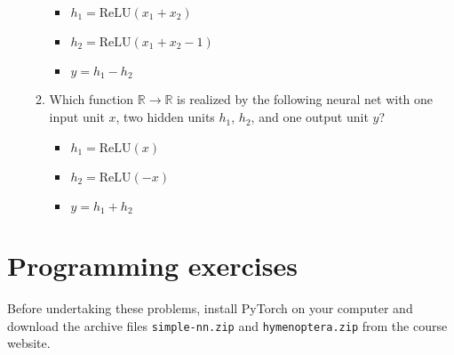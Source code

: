 \documentclass{article}
\begin{document}
\begin{enumerate}
\begin{enumerate}
        \begin{itemize}
            \item $h_{1}=\text{ReLU}(x_{1}+x_{2})$
            \item $h_{2}=\text{ReLU}(x_{1}+x_{2}-1)$
            \item $y=h_{1}-h_{2}$
        \end{itemize}

        \item Which function $\mathbb{R} \rightarrow \mathbb{R}$ is realized by the following neural net with one input unit $x$, two hidden units $h_{1}$, $h_{2}$, and one output unit $y$?

        \begin{itemize}
            \item $h_{1}=\text{ReLU}(x)$
            \item $h_{2}=\text{ReLU}(-x)$
            \item $y=h_{1}+h_{2}$
        \end{itemize}
    \end{enumerate}
\end{enumerate}

\section*{Programming exercises}

Before undertaking these problems, install PyTorch on your computer and download the archive files \texttt{simple-nn.zip} and \texttt{hymenoptera.zip} from the course website.
\end{document}
